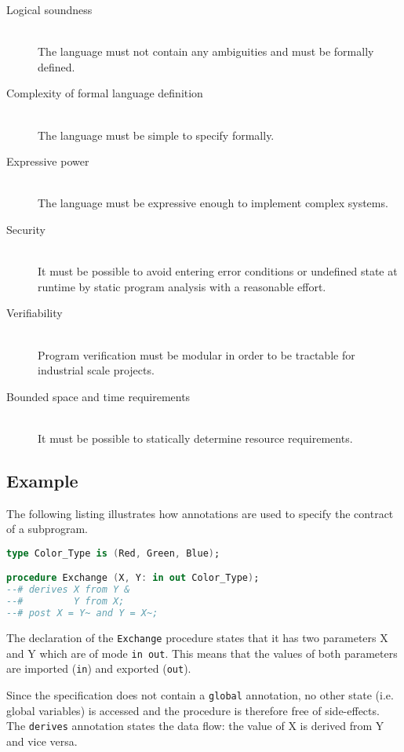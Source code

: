 \begin{description}
	\item[Logical soundness] \hfill \\
		The language must not contain any ambiguities and must be formally
		defined.
	\item[Complexity of formal language definition] \hfill \\
		The language must be simple to specify formally.
	\item[Expressive power] \hfill \\
		The language must be expressive enough to implement complex systems.
	\item[Security] \hfill \\
		It must be possible to avoid entering error conditions or undefined
		state at runtime by static program analysis with a reasonable effort.
	\item[Verifiability] \hfill \\
		Program verification must be modular in order to be tractable for
		industrial scale projects.
	\item[Bounded space and time requirements] \hfill \\
		It must be possible to statically determine resource requirements.
\end{description}

\subsection{Example}
The following listing illustrates how annotations are used to specify the
contract of a subprogram.

\begin{lstlisting}[language=Ada]
type Color_Type is (Red, Green, Blue);

procedure Exchange (X, Y: in out Color_Type);
--# derives X from Y &
--#         Y from X;
--# post X = Y~ and Y = X~;
\end{lstlisting}

The declaration of the \texttt{Exchange} procedure states that it has two
parameters X and Y which are of mode \texttt{in out}. This means that the values
of both parameters are imported (\texttt{in}) and exported (\texttt{out}).

Since the specification does not contain a \texttt{global} annotation, no other
state (i.e. global variables) is accessed and the procedure is therefore free of
side-effects. The \texttt{derives} annotation states the data flow: the value of
X is derived from Y and vice versa.

